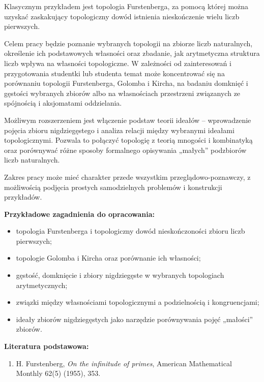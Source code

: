 \documentclass[12pt,a4paper]{article}
\begin{document}
\begin{itemize}
Klasycznym przykładem jest topologia Furstenberga, za pomocą której można
uzyskać zaskakujący topologiczny dowód istnienia nieskończenie wielu liczb
pierwszych.

Celem pracy będzie poznanie wybranych topologii na zbiorze liczb naturalnych,
określenie ich podstawowych własności oraz zbadanie, jak arytmetyczna
struktura liczb wpływa na własności topologiczne. W zależności od
zainteresowań i przygotowania studentki lub studenta temat może
koncentrować się na porównaniu topologii Furstenberga, Golomba i Kircha,
na badaniu domknięć i gęstości wybranych zbiorów albo na własnościach
przestrzeni związanych ze spójnością i aksjomatami oddzielania.

Możliwym rozszerzeniem jest włączenie podstaw teorii ideałów -- wprowadzenie
pojęcia zbioru nigdziegęstego i analiza relacji między wybranymi ideałami
topologicznymi. Pozwala to połączyć topologię z teorią mnogości i
kombinatyką oraz porównywać różne sposoby formalnego opisywania
„małych” podzbiorów liczb naturalnych.

Zakres pracy może mieć charakter przede wszystkim przeglądowo-poznawczy,
z możliwością podjęcia prostych samodzielnych problemów i konstrukcji
przykładów.

\bigskip

\noindent
\textbf{Przykładowe zagadnienia do opracowania:}

\begin{itemize}[leftmargin=*]
    \item topologia Furstenberga i topologiczny dowód nieskończoności
    zbioru liczb pierwszych;
    
    \item topologie Golomba i Kircha oraz porównanie ich własności;
    
    \item gęstość, domknięcie i zbiory nigdziegęste w wybranych
    topologiach arytmetycznych;
    
    \item związki między własnościami topologicznymi a podzielnością
    i kongruencjami;
    
    \item ideały zbiorów nigdziegęstych jako narzędzie porównywania
    pojęć „małości” zbiorów.
\end{itemize}

\bigskip

\noindent
\textbf{Literatura podstawowa:}

\begin{enumerate}[leftmargin=*]
    \item H. Furstenberg, \emph{On the infinitude of primes},
    American Mathematical Monthly 62(5) (1955), 353.


\end{enumerate}
\end{itemize}
\end{document}
